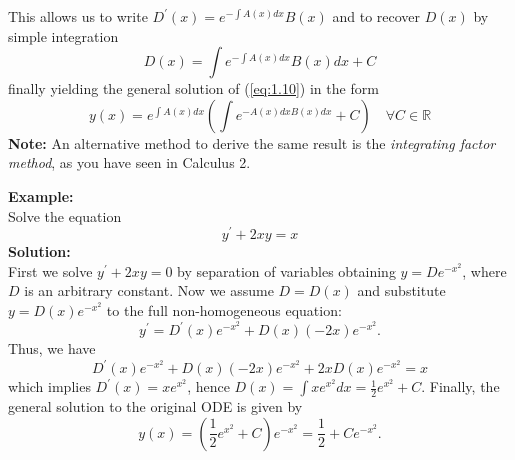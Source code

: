 \documentclass[11pt,a4paper,twoside]{article}
\begin{document}
	This allows us to write $D^\prime (x) = e^{-\int A(x)dx}B(x)$ and to recover $D(x)$ by simple integration
	\begin{equation}\label{eq:1.15}
		D(x) = \int e^{-\int A(x)dx}B(x)dx + C
	\end{equation}
	finally yielding the general solution of (\ref{eq:1.10}) in the form
	\begin{equation}
		y(x) = e^{\int A(x)dx}\left(\int e^{-A(x)dxB(x)dx} + C\right)\quad \forall C \in \mathbb{R}
	\end{equation}
	\textbf{Note:} An alternative method to derive the same result is the \textit{integrating factor method}, as you have seen in Calculus 2.\par
	\textbf{Example:}\\
	Solve the equation
	$$
	y^\prime + 2xy = x
	$$
	\textbf{Solution:}\\
	First we solve $y^\prime + 2xy = 0$ by separation of variables obtaining $y = De^{-x^2}$, where $D$ is an arbitrary constant. Now we assume $D = D(x)$ and substitute $y = D(x)e^{-x^2}$ to the full non-homogeneous equation:
	$$
	y^\prime = D^\prime (x)e^{-x^2} + D(x)(-2x)e^{-x^2}.
	$$
	Thus, we have
	$$
	D^\prime(x)e^{-x^2} + D(x)(-2x)e^{-x^2} + 2xD(x)e^{-x^2} = x
	$$
	which implies $D^\prime(x) = xe^{x^2}$, hence $D(x) = \int xe^{x^2}dx = \frac{1}{2}e^{x^2}+C$. Finally, the general solution to the original ODE is given by
	$$
	y(x)
	= \left(\frac{1}{2}e^{x^2}+C\right)e^{-x^2}
	= \frac{1}{2} + Ce^{-x^2}.
	$$
	
\end{document}
